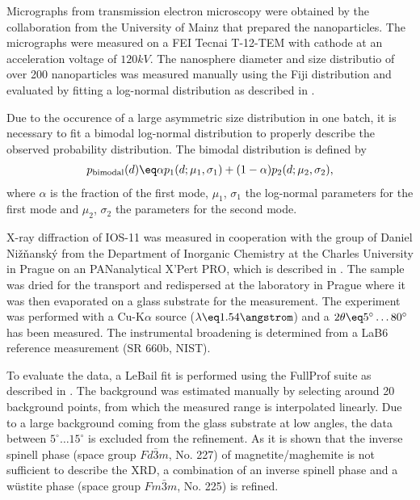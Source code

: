 \documentclass[\main/dresen_thesis.tex]{subfiles}
\begin{document}
    Micrographs from transmission electron microscopy were obtained by the collaboration from the University of Mainz that prepared the nanoparticles.
    The micrographs were measured on a FEI Tecnai T-12-TEM with  cathode at an acceleration voltage of $120 \unit{kV}$.
    The nanosphere diameter and size distributio of over 200 nanoparticles was measured manually using the Fiji distribution \cite{Schindelin_2012_Fijia} and evaluated by fitting a log-normal distribution as described in .

    Due to the occurence of a large asymmetric size distribution in one batch, it is necessary to fit a bimodal log-normal distribution to properly describe the observed probability distribution.
    The bimodal distribution is defined by
    \begin{align}
      p_\mathrm{bimodal}(d) \eq \alpha p_1(d; \mu_1, \sigma_1) + (1 - \alpha) p_2(d; \mu_2, \sigma_2),
    \end{align}
    where $\alpha$ is the fraction of the first mode, $\mu_1$, $\sigma_1$ the log-normal parameters for the first mode and $\mu_2$, $\sigma_2$ the parameters for the second mode.

    X-ray diffraction of IOS-11 was measured in cooperation with the group of Daniel Nižňanský from the Department of Inorganic Chemistry at the Charles University in Prague on an PANanalytical X'Pert PRO, which is described in .
    The sample was dried for the transport and redispersed at the laboratory in Prague where it was then evaporated on a glass substrate for the measurement.
    The experiment was performed with a Cu-K$\alpha$ source ($\lambda \eq 1.54 \angstrom$) and a $2 \theta \eq 5^\circ \ldots 80^\circ$ has been measured.
    The instrumental broadening is determined from a LaB6 reference measurement (SR 660b, NIST).

    To evaluate the data, a LeBail fit is performed using the FullProf suite \cite{Rodriguez_1993_Recen} as described in .
    The background was estimated manually by selecting around 20 background points, from which the measured range is interpolated linearly.
    Due to a large background coming from the glass substrate at low angles, the data between $5 ^\circ \ldots 15 ^\circ$ is excluded from the refinement.
    As it is shown that the inverse spinell phase (space group $Fd\bar{3}m$, No. 227) of magnetite/maghemite is not sufficient to describe the XRD, a combination of an inverse spinell phase and a w\"ustite phase (space group $Fm\bar{3}m$, No. 225) is refined.
\end{document}
